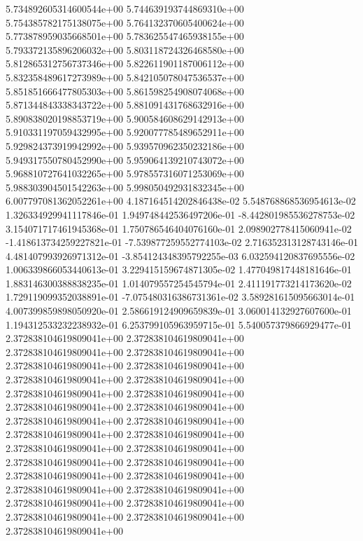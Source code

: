 5.734892605314600544e+00	5.744639193744869310e+00	5.754385782175138075e+00	5.764132370605400624e+00	5.773878959035668501e+00	5.783625547465938155e+00	5.793372135896206032e+00	5.803118724326468580e+00	5.812865312756737346e+00	5.822611901187006112e+00	5.832358489617273989e+00	5.842105078047536537e+00	5.851851666477805303e+00	5.861598254908074068e+00	5.871344843338343722e+00	5.881091431768632916e+00	5.890838020198853719e+00	5.900584608629142913e+00	5.910331197059432995e+00	5.920077785489652911e+00	5.929824373919942992e+00	5.939570962350232186e+00	5.949317550780452990e+00	5.959064139210743072e+00	5.968810727641032265e+00	5.978557316071253069e+00	5.988303904501542263e+00	5.998050492931832345e+00	6.007797081362052261e+00
4.187164514202846438e-02	5.548768868536954613e-02	1.326334929941117846e-01	1.949748442536497206e-01	-8.442801985536278753e-02	3.154071717461945368e-01	1.750786546404076160e-01	2.098902778415060941e-02	-1.418613734259227821e-01	-7.539877259552774103e-02	2.716352313128743146e-01	4.481407993926971312e-01	-3.854124348395792255e-03	6.032594120837695556e-02	1.006339866053440613e-01	3.229415159674871305e-02	1.477049817448181646e-01	1.883146300388838235e-01	1.014079557254545794e-01	2.411191773214173620e-02	1.729119099352038891e-01	-7.075480316386731361e-02	3.589281615095663014e-01	4.007399859898050920e-01	2.586619124909659839e-01	3.060014132927607600e-01	1.194312533232238932e-01	6.253799105963959715e-01	5.540057379866929477e-01
2.372838104619809041e+00	2.372838104619809041e+00	2.372838104619809041e+00	2.372838104619809041e+00	2.372838104619809041e+00	2.372838104619809041e+00	2.372838104619809041e+00	2.372838104619809041e+00	2.372838104619809041e+00	2.372838104619809041e+00	2.372838104619809041e+00	2.372838104619809041e+00	2.372838104619809041e+00	2.372838104619809041e+00	2.372838104619809041e+00	2.372838104619809041e+00	2.372838104619809041e+00	2.372838104619809041e+00	2.372838104619809041e+00	2.372838104619809041e+00	2.372838104619809041e+00	2.372838104619809041e+00	2.372838104619809041e+00	2.372838104619809041e+00	2.372838104619809041e+00	2.372838104619809041e+00	2.372838104619809041e+00	2.372838104619809041e+00	2.372838104619809041e+00

